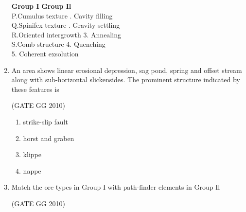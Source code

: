 \documentclass[journal]{IEEEtran}
\begin{document}
\begin{enumerate}[start=1]
\vspace{0.5cm}
\textbf{Group I} \hspace{4.3cm}
\textbf{Group Il}\\
P.Cumulus texture \qquad \qquad \qquad {}. Cavity filling\\
Q.Spinifex texture \qquad \qquad \qquad {}. Gravity settling\\
R.Oriented intergrowth \qquad \qquad \quad \quad \hspace{0.02cm}3. Annealing\\
S.Comb structure \qquad \qquad \qquad \qquad \hspace{0.1cm}4. Quenching\\
\hspace*{5.52cm}5. Coherent exsolution
\begin{enumerate}
\end{enumerate}

\item An area shows linear erosional depression, sag pond, spring and offset stream along with sub-horizontal slickensides. The prominent structure indicated by these features is

\hfill{(GATE GG 2010)}

\begin{enumerate}
    \item strike-slip fault
    \item horst and graben
    \item klippe
    \item nappe
\end{enumerate}

\item  Match the ore types  in Group I with path-finder elements in Group Il

(GATE GG 2010)\\


\end{enumerate}
\end{document}
